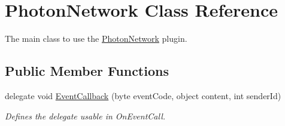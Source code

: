 \hypertarget{class_photon_network}{}\section{Photon\+Network Class Reference}
\label{class_photon_network}


The main class to use the \hyperlink{class_photon_network}{Photon\+Network} plugin.  


\subsection*{Public Member Functions}
\begin{DoxyCompactItemize}
\item 
delegate void \hyperlink{class_photon_network_a90ec16d1df1a0332d0ad16493d641f56}{Event\+Callback} (byte event\+Code, object content, int sender\+Id)
\begin{DoxyCompactList}\small\item\em Defines the delegate usable in On\+Event\+Call. \end{DoxyCompactList}\end{DoxyCompactItemize}
